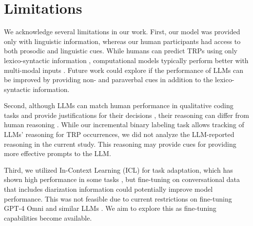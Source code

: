 

\section{Limitations}
\label{sec:future}

We acknowledge several limitations in our work. First, our model was provided only with linguistic information, whereas our human participants had access to both prosodic and linguistic cues. While humans can predict TRPs using only lexico-syntactic information \cite{deRuiter2006ProjectingTheEnd}, computational models typically perform better with multi-modal inputs \cite{roddy2021neural, kurata2023multimodal}. Future work could explore if the performance of LLMs can be improved by providing non- and paraverbal cues in addition to the lexico-syntactic information.

Second, although LLMs can match human performance in qualitative coding tasks and provide justifications for their decisions \cite{dunivin2024scalable}, their reasoning can differ from human reasoning \cite{bao2024llms}. While our incremental binary labeling task allows tracking of LLMs' reasoning for TRP occurrences, we did not analyze the LLM-reported reasoning in the current study. This reasoning may provide cues for providing more effective prompts to the LLM.

Third, we utilized In-Context Learning (ICL) for task adaptation, which has shown high performance in some tasks \cite{chang2024efficient}, but fine-tuning on conversational data that includes diarization information could potentially improve model performance. This was not feasible due to current restrictions on fine-tuning GPT-4 Omni and similar LLMs \cite{liesenfeld2024rethinking}. We aim to explore this as fine-tuning capabilities become available.

